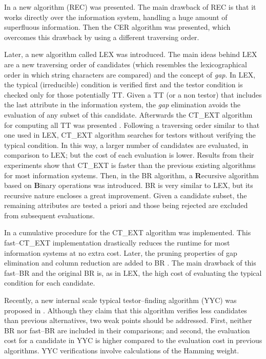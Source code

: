 \documentclass[number,preprint,review,12pt]{elsarticle}
\begin{document}
  In \citep{Shulcloper95b} a new algorithm (REC) was presented. The main drawback of REC is that it works directly over the information system, handling a huge amount of superfluous information. Then the CER algorithm \cite{Ayaquica97} was presented, which overcomes this drawback by using a different traversing order.  
  
  Later, a new algorithm called LEX \cite{Santiesteban03} was introduced. The main ideas behind LEX are a new traversing order of candidates (which resembles the lexicographical order in which string characters are compared) and the concept of \emph{gap}. In LEX, the typical (irreducible) condition is verified first and the testor condition is checked only for those potentially TT. Given a TT (or a non testor) that includes the last attribute in the information system, the \emph{gap} elimination avoids the evaluation of any subset of this candidate. Afterwards the CT\_EXT algorithm for computing all TT was presented \cite{Sanchez07}. Following a traversing order similar to that one used in LEX, CT\_EXT algorithm searches for testors without verifying the typical condition. In this way, a larger number of candidates are evaluated, in comparison to LEX; but the cost of each evaluation is lower. Results from their experiments show that CT\_EXT is faster than the previous existing algorithms for most information systems. Then, in \cite{Lias09} the BR algorithm, a \textbf{R}ecursive algorithm based on \textbf{B}inary operations was introduced. BR is very similar to LEX, but its recursive nature encloses a great improvement. Given a candidate subset, the remaining attributes are tested a priori and those being rejected are excluded from subsequent evaluations. 
  
  In \cite{Sanchez10} a cumulative procedure for the CT\_EXT algorithm was implemented. This fast--CT\_EXT implementation drastically reduces the runtime for most information systems at no extra cost. Later, the pruning properties of gap elimination and column reduction are added to BR \citep{Lias13}. The main drawback of this fast--BR and the original BR is, as in LEX, the high cost of evaluating the typical condition for each candidate.
  
  Recently, a new internal scale typical testor--finding algorithm (YYC) was proposed in \cite{Alba14}.   Although they claim that this algorithm verifies less candidates than previous alternatives, two weak points should be addressed. First, neither BR nor fast--BR are included in their comparisons; and second, the evaluation cost for a candidate in YYC is higher compared to the evaluation cost in previous algorithms. YYC verifications involve calculations of the Hamming weight.
  
\end{document}
